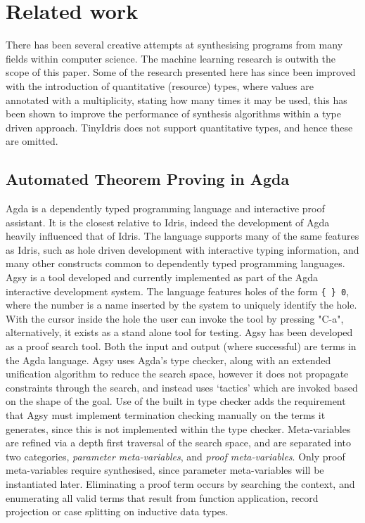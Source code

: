 \documentclass[a4paper]{article}
\begin{document}
\clearpage

\section{Related work}
\label{sec:orgbfa1aeb}

There has been several creative attempts at synthesising programs from 
many fields within computer science. 
The machine learning research is outwith the scope of this paper. 
Some of the research presented here has since been improved with the
introduction of quantitative (resource) types, where values are
annotated with a multiplicity, stating how many times it may be used, 
this has been shown to improve the performance of synthesis algorithms 
within a type driven approach. TinyIdris does not support quantitative
types, and hence these are omitted.

\subsection{Automated Theorem Proving in Agda}
\label{sec:org9bbd902}
Agda is a dependently typed programming language and interactive proof 
assistant. It is the closest relative to Idris, indeed the development 
of Agda heavily influenced that of Idris. The language supports many
of the same features as Idris, such as hole driven development with 
interactive typing information, and many other constructs common to 
dependently typed programming languages. Agsy is a tool developed and 
currently implemented as part of the Agda interactive development system.
The language features holes of the form \texttt{\{ \} 0}, where the 
number is a name inserted by the system to uniquely identify the hole.
With the cursor inside the hole the user 
can invoke the tool by pressing "C-a", alternatively, it exists as a 
stand alone tool for testing. Agsy has been developed as a proof search 
tool. Both the input and output (where successful) are terms in the Agda 
language. Agsy uses Agda's type checker, along with an extended 
unification algorithm to reduce the search space, however it does not 
propagate constraints through the search, and instead uses `tactics' 
which are invoked based on the shape of the goal. Use of the built in 
type checker adds the requirement that Agsy must implement termination
checking manually on the terms it generates, since this is not 
implemented within the type checker. Meta-variables are refined via a 
depth first traversal of the search space, and are separated into 
two categories, \emph{parameter meta-variables}, and \emph{proof meta-variables}.
Only proof meta-variables require synthesised, since parameter 
meta-variables will be instantiated later. Eliminating a proof term
occurs by searching the context, and enumerating all valid terms that 
result from function application, record projection or case splitting on
inductive data types.
\end{document}
